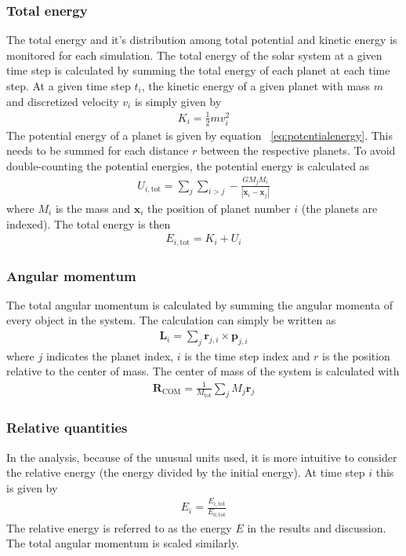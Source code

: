 \documentclass[aps,reprint]{revtex4-1}
\begin{document}
\subsubsection{Total energy}
The total energy and it's distribution among total potential and kinetic energy
is monitored for each simulation. The total energy of the solar system at a given time step is
calculated by summing the total energy of each planet at each time step.
At a given time step $t_i$, the kinetic energy of a given planet with mass $m$
and discretized velocity $v_i$ is simply given by
\begin{align}
  K_i = \frac{1}{2} m v_i^2
\end{align}
The potential energy of a planet is given by equation ~\ref{eq:potentialenergy}.
This needs to be summed for each distance $r$ between the respective planets. To
avoid double-counting the potential energies, the potential energy is calculated
as
\begin{align}
  U_{i, \text{tot}} = \sum_j \sum_{i > j} - \frac{G M_j M_i}{|\mathbf{x}_i - \mathbf{x}_j|}
\end{align}
where $M_i$ is the mass and $\mathbf{x}_i$ the position of planet number $i$
(the planets are indexed). The total energy is then
\begin{align}
  E_{i,\text{tot}} = K_i + U_i
\end{align}
\subsubsection{Angular momentum}
The total angular momentum is calculated by summing the angular momenta of
every object in the system. The calculation can simply be written as
\begin{align}
  \mathbf{L}_i = \sum_j \mathbf{r}_{j,i} \times \mathbf{p}_{j,i}
\end{align}
where $j$ indicates the planet index, $i$ is the time step index and $r$ is the
position relative to the center of mass. The center of mass of the system
is calculated with
\begin{align}
  \mathbf{R}_\text{COM} = \frac{1}{M_\text{tot}} \sum_j M_j \mathbf{r}_j
\end{align}
\subsubsection{Relative quantities}
In the analysis, because of the unusual units used, it is more intuitive to
consider the relative energy (the energy divided by the initial energy). At time step $i$
this is given by
\begin{align}
  E_i = \frac{E_{i,\text{tot}}}{E_{0,\text{tot}}}
\end{align}
The relative energy is referred to as the energy $E$ in the results and
discussion. The total angular momentum is scaled similarly.
\end{document}
